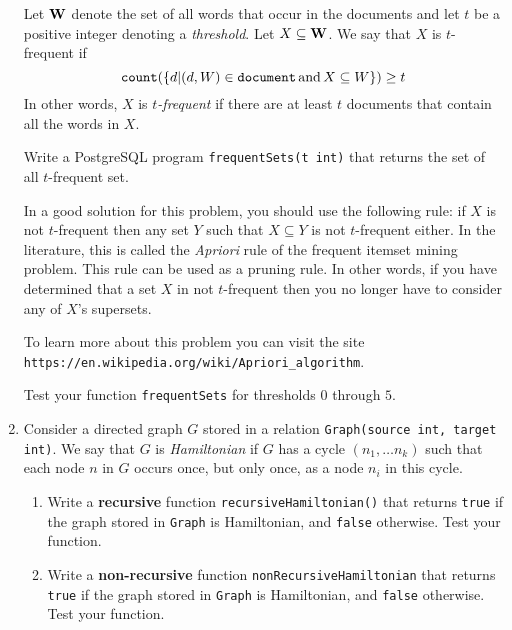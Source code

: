 \documentclass{article}
\begin{document}
\begin{enumerate}[resume]
Let ${\bf W}$ denote the set of all words that occur in the documents and
let $t$ be a positive integer denoting a \emph{threshold}. 
Let $X \subseteq {\bf W}$.   We say that $X$ is $t$-frequent if
\[{\tt count}(\{d| (d,W)\in {\tt document}\,\mbox{\rm and}\, X\subseteq W\}) \geq t\]
In other words, $X$ is \emph{$t$-frequent} if there are at least $t$ documents that contain
all the words in $X$.

Write a PostgreSQL program {\tt frequentSets(t int)} that returns the set of all $t$-frequent set.

In a good solution for this problem, you should use the following rule:
if $X$ is not $t$-frequent then any set $Y$ such that $X\subseteq Y$ is not $t$-frequent either.
In the literature, this is called the \emph{Apriori} rule of the frequent itemset mining problem.
This rule can be used as a pruning rule.   In other words, if you have determined that a
set $X$ in not $t$-frequent then you no longer have to consider any of $X$'s supersets.

To learn more about this problem you can visit the site\\ {\tt https://en.wikipedia.org/wiki/Apriori\_algorithm}.

Test your function {\tt frequentSets} for thresholds $0$ through $5$.

\newpage

\item Consider a directed graph $G$ stored in a relation {\tt Graph(source int, target int)}.  We say that 
$G$ is \emph{Hamiltonian} if $G$ has a cycle $(n_1,\ldots n_k)$ such that each node $n$ in $G$ occurs once, but only once, as a node $n_i$ in this cycle.

\begin{enumerate}
\item Write a {\bf recursive} function {\tt recursiveHamiltonian()} that returns {\tt true} if the
graph stored in {\tt Graph} is Hamiltonian, and {\tt false} otherwise.   Test your function.
\item Write a {\bf non-recursive} function {\tt nonRecursiveHamiltonian}
that returns {\tt true} if the
graph stored in {\tt Graph} is Hamiltonian, and {\tt false} otherwise.   Test your function.
\end{enumerate}



\end{enumerate}



\newpage
\end{document}
